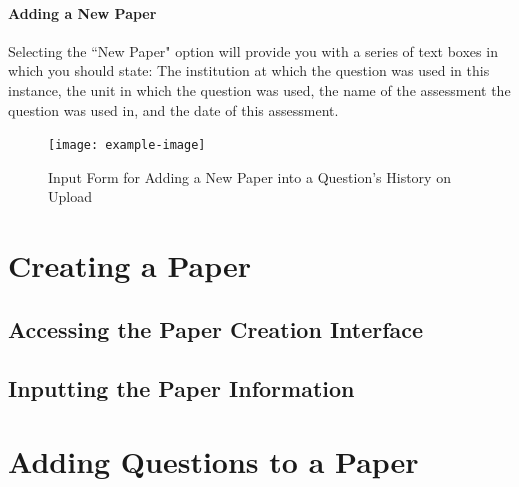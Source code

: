 \documentclass[12pt, a4paper, titlepage]{book}
\begin{document}
\subsubsection{Adding a New Paper}
Selecting the ``New Paper" option will provide you with a series of text boxes in which you should state: The institution at which the question was used in this instance, the unit in which the question was used, the name of the assessment the question was used in, and the date of this assessment.
\begin{figure}[htp]
\centering
\texttt{[image: example-image]}
\caption{Input Form for Adding a New Paper into a Question's History on Upload}
\end{figure}

\chapter{Creating a Paper}
\section{Accessing the Paper Creation Interface}


\section{Inputting the Paper Information}




\chapter{Adding Questions to a Paper} \label{ch:qadd}
\end{document}
